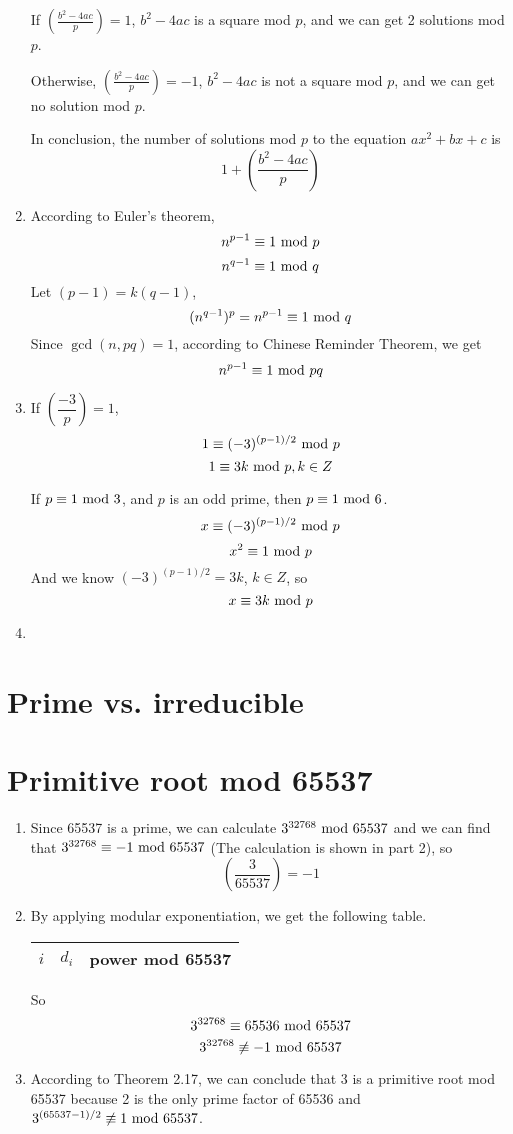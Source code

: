 \documentclass{article}
\renewcommand{\mod}{{\rm\ mod\ }}
\begin{document}
\begin{enumerate}
If $\left(\frac{b^2-4ac}{p}\right)=1$, $b^2-4ac$ is a square mod $p$, and we can get 2 solutions mod $p$.

Otherwise, $\left(\frac{b^2-4ac}{p}\right)=-1$, $b^2-4ac$ is not a square mod $p$, and we can get no solution mod $p$.

In conclusion, the number of solutions mod $p$ to the equation $ax^2+bx+c$ is 
$$1+\left(\frac{b^2-4ac}{p}\right)$$
\item
According to Euler's theorem, $$n^{p-1}\equiv1\mod p$$ $$n^{q-1}\equiv1\mod q$$
Let $(p-1)=k(q-1)$,
$$(n^{q-1})^p=n^{p-1}\equiv1\mod q$$
Since $\gcd(n,pq)=1$, according to Chinese Reminder Theorem, we get
$$n^{p-1}\equiv1\mod pq$$

\item
If $\left(\dfrac{-3}{p}\right)=1$,
$$1\equiv(-3)^{(p-1)/2}\mod p$$
$$1\equiv3k\mod p,k\in Z$$



If $p\equiv1\mod3$, and $p$ is an odd prime, then $p\equiv1\mod6$.
$$x\equiv(-3)^{(p-1)/2}\mod p$$
$$x^2\equiv 1\mod p$$
And we know $(-3)^{(p-1)/2}=3k$, $k\in Z$, so
$$x\equiv 3k\mod p$$
\item

\end{enumerate}

\section{Prime vs. irreducible}

\section{Primitive root mod 65537}
\begin{enumerate}
\item
Since 65537 is a prime, we can calculate $3^{32768}\mod65537$ and we can find that $3^{32768}\equiv-1\mod65537$ (The calculation is shown in part 2), so $$\left(\frac{3}{65537}\right)=-1$$
\item
By applying modular exponentiation, we get the following table.
\begin{center}
\begin{tabular}{ccc}
$i$ & $d_i$ & power mod 65537 \\\hline

\end{tabular}
\end{center}

So $$3^{32768}\equiv65536\mod65537$$
$$3^{32768}\not\equiv-1\mod65537$$

\item
According to Theorem 2.17, we can conclude that 3 is a primitive root mod 65537 because 2 is the only prime factor of 65536 and $3^{(65537-1)/2}\not\equiv1\mod65537$.
\end{enumerate}
\end{document}
